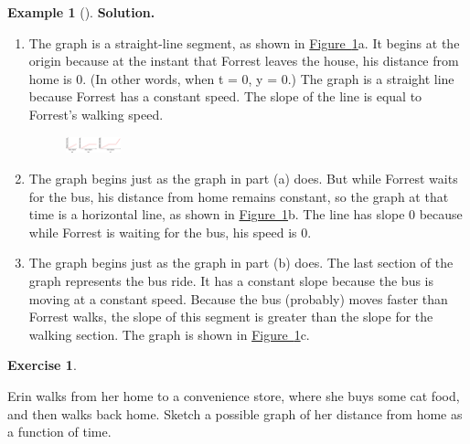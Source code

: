 \documentclass[10pt,]{book}
\theoremstyle{plain}
\theoremstyle{definition}
\newtheorem{exercise}[theorem]{Exercise}
\theoremstyle{definition}
\newtheorem{example}[theorem]{Example}
\numberwithin{equation}{section}
\begin{document}
\begin{example}[]
\par\medskip\noindent%
\textbf{Solution.}\quad \leavevmode%
\begin{enumerate}[label=*\alph**]
\item\hypertarget{li-320}{}The graph is a straight-line segment, as shown in \hyperref[fig-home-to-school]{Figure~\ref{fig-home-to-school}}a. It begins at the origin because at the instant that Forrest leaves the house, his distance from home is 0. (In other words, when t = 0, y = 0.) The graph is a straight line because Forrest has a constant speed. The slope of the line is equal to Forrest’s walking speed.
            \leavevmode%
\begin{figure}
\centering
\includegraphics[width=0.150\textwidth,]{images/fig-home-to-school.svg}\caption{\label{fig-home-to-school}}
\end{figure}
\item\hypertarget{li-321}{}The graph begins just as the graph in part (a) does. But while Forrest waits for the bus, his distance from home remains constant, so the graph at that time is a horizontal line, as shown in \hyperref[fig-home-to-school]{Figure~\ref{fig-home-to-school}}b. The line has slope \(0\) because while Forrest is waiting for the bus, his speed is \(0\).
            \item\hypertarget{li-322}{}
                The graph begins just as the graph in part (b) does. The last section of the graph represents the bus ride. It has a constant slope because the bus is moving at a constant speed. Because the bus (probably) moves faster than Forrest walks, the slope of this segment is greater than the slope for the walking section. The graph is shown in \hyperref[fig-home-to-school]{Figure~\ref{fig-home-to-school}}c.
            \end{enumerate}
\end{example}
\begin{exercise}\label{exercise-walk-to-store}

    Erin walks from her home to a convenience store, where she buys some cat food, and then walks back home. Sketch a possible graph of her distance from home as a function of time.
\end{exercise}
\par
\end{document}
